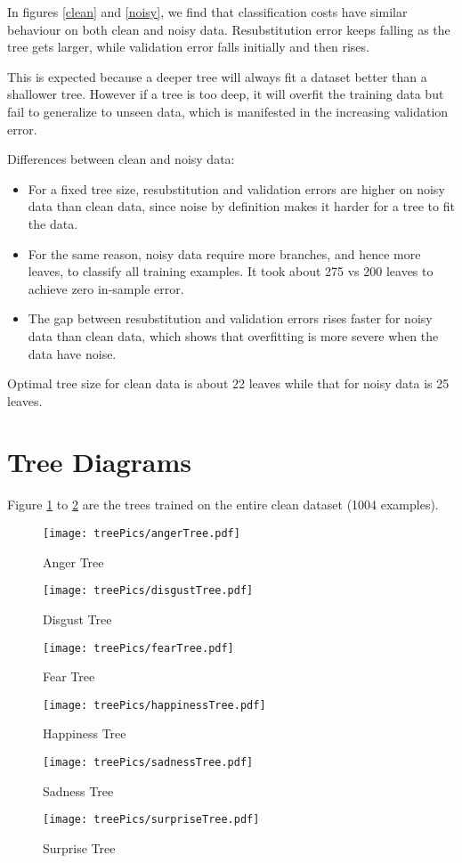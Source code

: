 \documentclass[12pt, a4paper]{article}
\begin{document}
In figures \ref{clean} and \ref{noisy}, we find that classification costs have similar behaviour on both clean and noisy data. Resubstitution error keeps falling as the tree gets larger, while validation error falls initially and then rises.\par
\bigskip
This is expected because a deeper tree will always fit a dataset better than a shallower tree. However if a tree is too deep, it will overfit the training data but fail to generalize to unseen data, which is manifested in the increasing validation error.\par
\bigskip
Differences between clean and noisy data:
\begin{itemize}
    \item For a fixed tree size, resubstitution and validation errors are higher on noisy data than clean data, since noise by definition makes it harder for a tree to fit the data.
    \item For the same reason, noisy data require more branches, and hence more leaves, to classify all training examples. It took about 275 vs 200 leaves to achieve zero in-sample error.
    \item The gap between resubstitution and validation errors rises faster for noisy data than clean data, which shows that overfitting is more severe when the data have noise.
\end{itemize}
Optimal tree size for clean data is about 22 leaves while that for noisy data is 25 leaves.\par

\newpage

\section*{Tree Diagrams}
Figure \ref{firstTree} to \ref{lastTree} are the trees trained on the entire clean dataset (1004 examples).

\begin{figure}[h!]
\centering
\texttt{[image: treePics/angerTree.pdf]}
\caption{Anger Tree}
\label{firstTree}
\end{figure}
\begin{figure}[h!]
\centering
\texttt{[image: treePics/disgustTree.pdf]}
\caption{Disgust Tree}
\end{figure}
\begin{figure}[h!]
\centering
\texttt{[image: treePics/fearTree.pdf]}
\caption{Fear Tree}
\end{figure}
\begin{figure}[!hb]
\centering
\texttt{[image: treePics/happinessTree.pdf]}
\caption{Happiness Tree}
\end{figure}
\begin{figure}[!hb]
\centering
\texttt{[image: treePics/sadnessTree.pdf]}
\caption{Sadness Tree}
\end{figure}
\begin{figure}[!hb]
\centering
\texttt{[image: treePics/surpriseTree.pdf]}
\caption{Surprise Tree}
\label{lastTree}
\end{figure}
\end{document}
